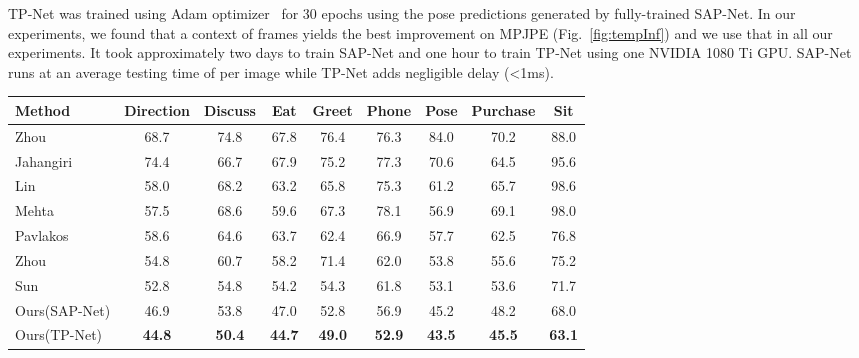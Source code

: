 \documentclass[runningheads]{llncs}
\begin{document}
TP-Net was trained using Adam optimizer~\cite{kingma2014adam} for 30 epochs using the pose predictions generated by fully-trained SAP-Net. 
In our experiments, we found that a context of  frames yields the best improvement on MPJPE (Fig.~\ref{fig:tempInf}) and we use that in all our experiments. It took approximately two days to train SAP-Net and one hour to train TP-Net using one NVIDIA 1080 Ti GPU. SAP-Net runs at an average testing time of  per image while TP-Net adds negligible delay (\textless1ms).

\begin{table*}[t]
\centering
\begin{tabular}{l  c  c  c  c  c  c  c  c }
\hline
Method & Direction & Discuss & Eat & Greet & Phone & Pose & Purchase & Sit \\
\hline
\hline
Zhou~\cite{zhou2016sparseness} & 68.7 & 74.8 & 67.8 & 76.4 & 76.3 & 84.0 & 70.2 & 88.0 \\
Jahangiri~\cite{Jahangiri:ICCV2017} & 74.4 & 66.7 & 67.9 & 75.2 & 77.3 & 70.6 & 64.5 & 95.6 \\
Lin~\cite{Lin_2017_CVPR} & 58.0 & 68.2 & 63.2 & 65.8 & 75.3 & 61.2 & 65.7 & 98.6 \\
Mehta~\cite{mono-3dhp2017}  & 57.5 & 68.6 & 59.6 & 67.3 & 78.1 & 56.9 & 69.1 & 98.0 \\
Pavlakos~\cite{Pavlakos_2017_CVPR} & 58.6 & 64.6 & 63.7 & 62.4 & 66.9 & 57.7 & 62.5 & 76.8 \\
Zhou~\cite{Zhou_2017_ICCV} & 54.8 & 60.7 & 58.2 & 71.4 & 62.0 & 53.8 & 55.6 & 75.2 \\
Sun~\cite{Sun_2017_ICCV} & 52.8 & 54.8 & 54.2 & 54.3 & 61.8 & 53.1 & 53.6 & 71.7 \\
\hline
Ours(SAP-Net) & 46.9 & 53.8 & 47.0 & 52.8 & 56.9 & 45.2 & 48.2 & 68.0  \\
Ours(TP-Net) & \textbf{44.8} & \textbf{50.4} & \textbf{44.7} & \textbf{49.0} & \textbf{52.9} & \textbf{43.5} & \textbf{45.5} & \textbf{63.1} \\


\end{tabular}
\end{table*}
\end{document}
